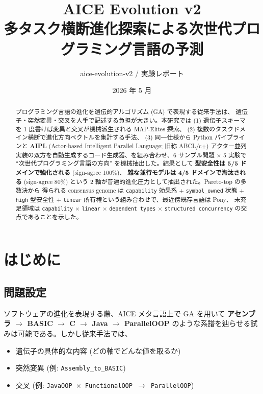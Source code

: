 \documentclass[a4paper,11pt]{article}
\title{\textbf{AICE Evolution v2}\\[2mm]
       \large 多タスク横断進化探索による次世代プログラミング言語の予測}
\author{aice-evolution-v2 / 実験レポート}
\date{2026 年 5 月}
\begin{document}
\maketitle

\begin{abstract}
\noindent
プログラミング言語の進化を遺伝的アルゴリズム (GA) で表現する従来手法は、
遺伝子・突然変異・交叉を人手で記述する負担が大きい。本研究では (1)
遺伝子スキーマを 1 度書けば変異と交叉が機械派生される MAP-Elites 探索、
(2) 複数のタスクドメイン横断で進化方向ベクトルを集計する手法、
(3) 同一仕様から Python パイプラインと {\bfseries AIPL}
(Actor-based Intelligent Parallel Language; 旧称 ABCL/c+) アクター並列
実装の双方を自動生成するコード生成器、を組み合わせ、6 サンプル問題
\(\times\) 5 実験で
``次世代プログラミング言語の方向'' を機械抽出した。結果として
{\bfseries 型安全性は 5/5 ドメインで強化される} (sign-agree 100\%)、
{\bfseries 雑な並行モデルは 4/5 ドメインで淘汰される} (sign-agree 80\%)
という 2 軸が普遍的進化圧力として抽出された。Pareto-top の多数決から
得られる consensus genome は \texttt{capability} 効果系 \(+\)
\texttt{symbol\_owned} 状態 \(+\) \texttt{high} 型安全性 \(+\)
\texttt{linear} 所有権という組み合わせで、最近傍既存言語は Pony、
未充足領域は \texttt{capability} \(\times\) \texttt{linear} \(\times\)
\texttt{dependent types} \(\times\) \texttt{structured concurrency}
の交点であることを示した。
\end{abstract}

\section{はじめに}

\subsection{問題設定}

ソフトウェアの進化を表現する際、AICE メタ言語上で GA を用いて
{\bfseries アセンブラ \(\rightarrow\) BASIC \(\rightarrow\) C \(\rightarrow\) Java \(\rightarrow\) ParallelOOP}
のような系譜を辿らせる試みは可能である。しかし従来手法では、

\begin{itemize}
  \item 遺伝子の具体的な内容 (どの軸でどんな値を取るか)
  \item 突然変異 (例: \texttt{Assembly\_to\_BASIC})
  \item 交叉 (例: \texttt{JavaOOP \(\times\) FunctionalOOP \(\to\) ParallelOOP})
\end{itemize}
\end{document}
